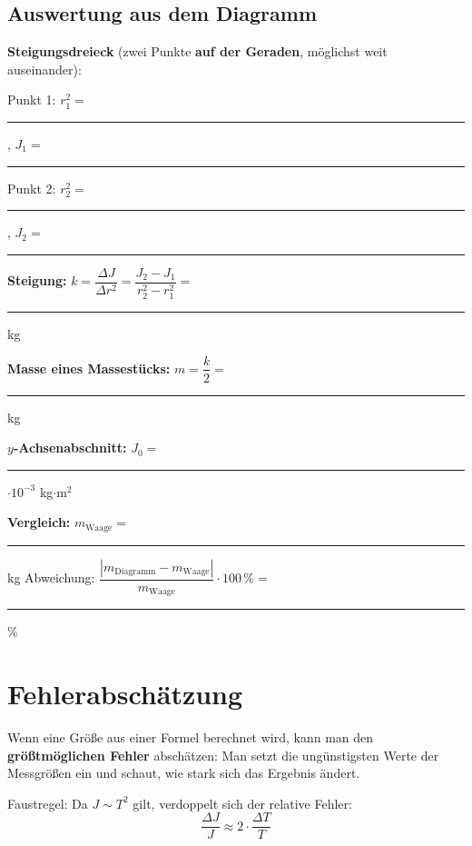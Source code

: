 \documentclass[11pt,a4paper]{scrartcl}
\begin{document}
\subsection*{Auswertung aus dem Diagramm}

\textbf{Steigungsdreieck} (zwei Punkte \textbf{auf der Geraden}, möglichst weit auseinander):

\vspace{0.3cm}
Punkt 1: $r^2_1 = $ \rule{2cm}{0.4pt}, \quad $J_1 = $ \rule{2cm}{0.4pt}

\vspace{0.3cm}
Punkt 2: $r^2_2 = $ \rule{2cm}{0.4pt}, \quad $J_2 = $ \rule{2cm}{0.4pt}

\vspace{0.3cm}
\textbf{Steigung:} $k = \dfrac{\Delta J}{\Delta r^2} = \dfrac{J_2 - J_1}{r^2_2 - r^2_1} = $ \rule{4cm}{0.4pt} kg

\vspace{0.5cm}
\textbf{Masse eines Massestücks:} $m = \dfrac{k}{2} = $ \rule{4cm}{0.4pt} kg

\vspace{0.5cm}
\textbf{$y$-Achsenabschnitt:} $J_0 = $ \rule{4cm}{0.4pt} $\cdot 10^{-3}$ kg$\cdot$m$^2$

\vspace{0.5cm}
\textbf{Vergleich:} $m_\text{Waage} = $ \rule{2cm}{0.4pt} kg \qquad Abweichung: $\dfrac{|m_\text{Diagramm} - m_\text{Waage}|}{m_\text{Waage}} \cdot 100\,\% = $ \rule{2cm}{0.4pt} \%

\newpage
\section*{Fehlerabschätzung}

\begin{infobox}[title={\faIcon{info-circle} Größtfehler-Methode (ohne Differenzialrechnung)}]
	Wenn eine Größe aus einer Formel berechnet wird, kann man den \textbf{größtmöglichen Fehler} abschätzen: Man setzt die ungünstigsten Werte der Messgrößen ein und schaut, wie stark sich das Ergebnis ändert.

	Faustregel: Da $J \sim T^2$ gilt, verdoppelt sich der relative Fehler:
	\[\frac{\Delta J}{J} \approx 2 \cdot \frac{\Delta T}{T}\]
\end{infobox}
\end{document}
